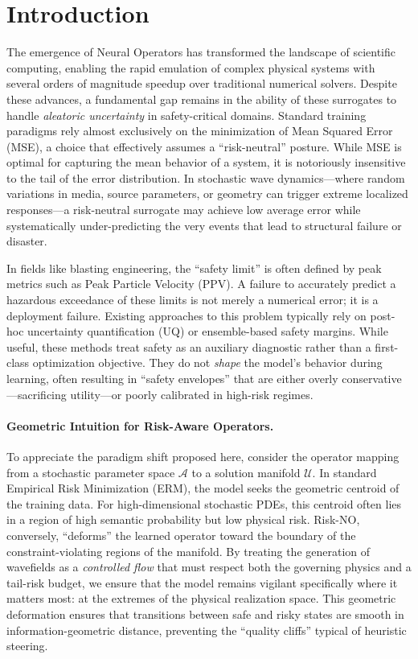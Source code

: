 \documentclass{article}
\theoremstyle{plain}
\theoremstyle{definition}
\theoremstyle{remark}
\begin{document}
\section{Introduction}
\label{sec:intro}

The emergence of Neural Operators \citep{lu2021learning, li2021fourier} has transformed the landscape of scientific computing, enabling the rapid emulation of complex physical systems with several orders of magnitude speedup over traditional numerical solvers. Despite these advances, a fundamental gap remains in the ability of these surrogates to handle \textit{aleatoric uncertainty} in safety-critical domains. Standard training paradigms rely almost exclusively on the minimization of Mean Squared Error (MSE), a choice that effectively assumes a ``risk-neutral'' posture. While MSE is optimal for capturing the mean behavior of a system, it is notoriously insensitive to the tail of the error distribution. In stochastic wave dynamics---where random variations in media, source parameters, or geometry can trigger extreme localized responses---a risk-neutral surrogate may achieve low average error while systematically under-predicting the very events that lead to structural failure or disaster.

In fields like blasting engineering, the ``safety limit'' is often defined by peak metrics such as Peak Particle Velocity (PPV). A failure to accurately predict a hazardous exceedance of these limits is not merely a numerical error; it is a deployment failure. Existing approaches to this problem typically rely on post-hoc uncertainty quantification (UQ) or ensemble-based safety margins. While useful, these methods treat safety as an auxiliary diagnostic rather than a first-class optimization objective. They do not \textit{shape} the model's behavior during learning, often resulting in ``safety envelopes'' that are either overly conservative---sacrificing utility---or poorly calibrated in high-risk regimes.

\paragraph{Geometric Intuition for Risk-Aware Operators.}
To appreciate the paradigm shift proposed here, consider the operator mapping from a stochastic parameter space $\mathcal{A}$ to a solution manifold $\mathcal{U}$. In standard Empirical Risk Minimization (ERM), the model seeks the geometric centroid of the training data. For high-dimensional stochastic PDEs, this centroid often lies in a region of high semantic probability but low physical risk. Risk-NO, conversely, ``deforms'' the learned operator toward the boundary of the constraint-violating regions of the manifold. By treating the generation of wavefields as a \textit{controlled flow} that must respect both the governing physics and a tail-risk budget, we ensure that the model remains vigilant specifically where it matters most: at the extremes of the physical realization space. This geometric deformation ensures that transitions between safe and risky states are smooth in information-geometric distance, preventing the ``quality cliffs'' typical of heuristic steering.
\end{document}
